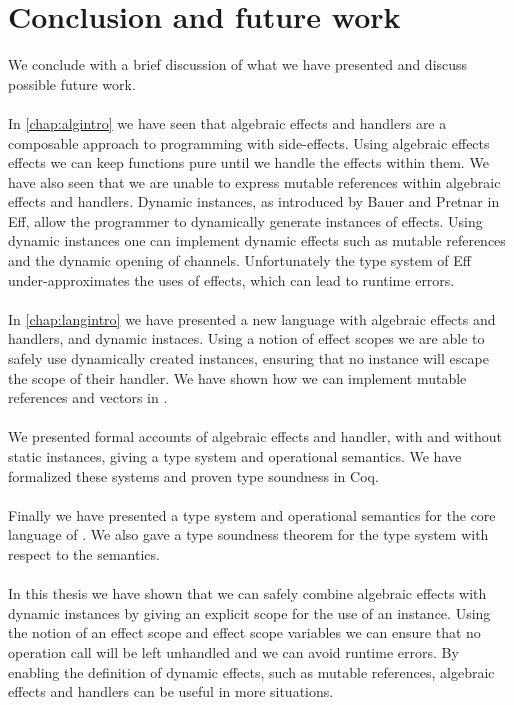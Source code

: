 \chapter{\label{chap:conclusion}Conclusion and future work}

We conclude with a brief discussion of what we have presented and discuss possible future work.
\\\\
In \cref{chap:algintro} we have seen that algebraic effects and handlers are a composable approach to programming with side-effects.
Using algebraic effects effects we can keep functions pure until we handle the effects within them.
We have also seen that we are unable to express mutable references within algebraic effects and handlers.
Dynamic instances, as introduced by Bauer and Pretnar in Eff, allow the programmer to dynamically generate instances of effects.
Using dynamic instances one can implement dynamic effects such as mutable references and the dynamic opening of channels.
Unfortunately the type system of Eff under-approximates the uses of effects, which can lead to runtime errors.
\\\\
In \cref{chap:langintro} we have presented a new language \lang{} with algebraic effects and handlers, and dynamic instaces.
Using a notion of effect scopes we are able to safely use dynamically created instances, ensuring that no instance will escape the scope of their handler.
We have shown how we can implement mutable references and vectors in \lang{}.
 \\\\
 We presented formal accounts of algebraic effects and handler, with and without static instances, giving a type system and operational semantics.
 We have formalized these systems and proven type soundness in Coq.
 \\\\
 Finally we have presented a type system and operational semantics for the core language of \lang{}.
 We also gave a type soundness theorem for the type system with respect to the semantics.
 \\\\
 In this thesis we have shown that we can safely combine algebraic effects with dynamic instances by giving an explicit scope for the use of an instance.
Using the notion of an effect scope and effect scope variables we can ensure that no operation call will be left unhandled and we can avoid runtime errors.
By enabling the definition of dynamic effects, such as mutable references, algebraic effects and handlers can be useful in more situations.
 
